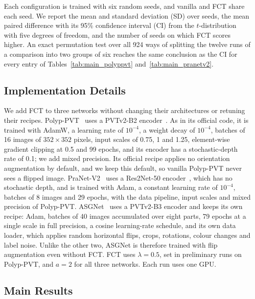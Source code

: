 Each configuration is trained with six random seeds, and vanilla and FCT share each seed. We report
the mean and standard deviation (SD) over seeds, the mean paired difference with its 95\% confidence
interval (CI) from the $t$-distribution with five degrees of freedom, and the number of seeds on which
FCT scores higher. An exact permutation test over all 924 ways of splitting the twelve runs of a
comparison into two groups of six reaches the same conclusion as the CI for every entry of
Tables~\ref{tab:main_polyppvt} and~\ref{tab:main_pranetv2}.

\subsection{Implementation Details}
\label{sec:implementation}

We add FCT to three networks without changing their architectures or retuning their recipes.
Polyp-PVT~\cite{dong2023polyppvt} uses a PVTv2-B2 encoder~\cite{wang2022pvtv2}. As in its official code,
it is trained with AdamW, a learning rate of $10^{-4}$, a weight decay of $10^{-4}$, batches of 16 images
of $352\times352$ pixels, input scales of 0.75, 1 and 1.25, element-wise gradient clipping at 0.5 and 99 epochs, and
its encoder has a stochastic-depth rate of 0.1; we add mixed precision. Its official recipe applies no orientation
augmentation by default, and we keep this default, so vanilla Polyp-PVT never sees a flipped image.
PraNet-V2~\cite{hu2026pranetv2} uses a Res2Net-50 encoder~\cite{gao2021res2net}, which has no stochastic
depth, and is trained with Adam, a constant learning rate of $10^{-4}$, batches of 8 images and 29
epochs, with the data pipeline, input scales and mixed precision of Polyp-PVT. ASGNet~\cite{sun2026asgnet} uses a PVTv2-B3 encoder and keeps its own
recipe: Adam, batches of 40 images accumulated over eight parts, 79 epochs at a single scale in full
precision, a cosine learning-rate schedule, and its own data loader, which applies random horizontal
flips, crops, rotations, colour changes and label noise. Unlike the other two, ASGNet is therefore
trained with flip augmentation even without FCT. FCT uses $\lambda=0.5$, set in preliminary runs on
Polyp-PVT, and $a=2$ for all three networks. Each run uses one  GPU.

\subsection{Main Results}
\label{sec:main}


